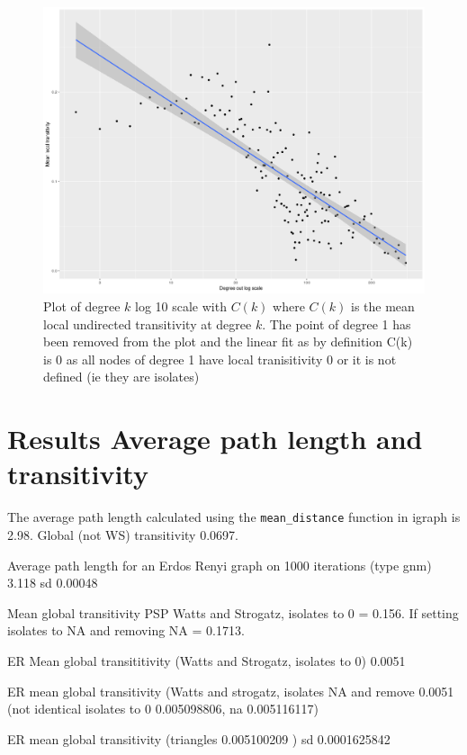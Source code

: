 \begin{figure}
    \centering
    \includegraphics[width=\textwidth]{images/Rplot_k(c)_remove0.png}
    \caption{Plot of degree $k$ log 10 scale with $C(k)$ where $C(k)$ is the mean local undirected transitivity at degree $k$. The point of degree 1 has been removed from the plot and the linear fit as by definition C(k) is 0 as all nodes of degree 1 have local tranisitivity 0 or it is not defined (ie they are isolates)}
    \label{fig:C(k)_remove0}
\end{figure}
\section{ Results Average path length and transitivity}
\label{sec:Results average path length and transitivity}
The average path length calculated using the \texttt{mean\_distance} function in igraph is 2.98. Global (not WS) transitivity 0.0697.

Average path length for an Erdos Renyi graph on 1000 iterations (type gnm) 3.118 sd 0.00048

Mean global transitivity PSP Watts and Strogatz, isolates to 0 = 0.156. If setting isolates to NA and removing NA = 0.1713.

ER Mean global transititivity (Watts and Strogatz, isolates to 0) 0.0051

ER mean global transitivity (Watts and strogatz, isolates NA and remove 0.0051 (not identical isolates to 0 0.005098806, na 0.005116117)

ER mean global transitivity (triangles 0.005100209 ) sd 0.0001625842


